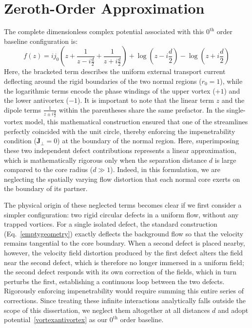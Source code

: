 \documentclass[english,binding=0.6cm,noexaminfo]{sapthesis}
\begin{document}
\section{Zeroth-Order Approximation}
\label{sec:zerodipole}
The complete dimensionless complex potential associated with this $0^{\text{th}}$ order baseline configuration is:
\begin{equation}
    f(z) = ij_0 \left( z + \frac{1}{z - i \frac{d}{2}} + \frac{1}{z + i \frac{d}{2}} \right) + \log\left(z - i \frac{d}{2}\right) - \log\left(z + i \frac{d}{2}\right)
\label{vortexantivortex}
\end{equation}
Here, the bracketed term describes the uniform external transport current deflecting around the rigid boundaries of the two normal regions ($r_0=1$), while the logarithmic terms encode the phase windings of the upper vortex ($+1$) and the lower antivortex ($-1$). It is important to note that the linear term $z$ and the dipole terms $\frac{1}{z \pm i\frac{d}{2}}$ within the parentheses share the same prefactor. In the single-vortex model, this mathematical construction ensured that one of the streamlines perfectly coincided with the unit circle, thereby enforcing the impenetrability condition ($\mathbf{J}_{\perp}=0$) at the boundary of the normal region. Here, superimposing these two independent defect contributions represents a linear approximation, which is mathematically rigorous only when the separation distance $d$ is large compared to the core radius ($d \gg 1$). Indeed, in this formulation, we are neglecting the spatially varying flow distortion that each normal core exerts on the boundary of its partner.

The physical origin of these neglected terms becomes clear if we first consider a simpler configuration: two rigid circular defects in a uniform flow, without any trapped vortices. For a single isolated defect, the standard construction (Eq.~\eqref{emptygeometry}) exactly deflects the background flow so that the velocity remains tangential to the core boundary. When a second defect is placed nearby, however, the velocity field distortion produced by the first defect alters the field near the second defect, which is therefore no longer immersed in a uniform field; the second defect responds with its own correction of the fields, which in turn perturbs the first, establishing a continuous loop between the two defects. Rigorously enforcing impenetrability would require summing this entire series of corrections. Since treating these infinite interactions analytically falls outside the scope of this dissertation, we neglect them altogether at all distances $d$ and adopt potential~\eqref{vortexantivortex} as our $0^{\text{th}}$ order baseline.
\end{document}
